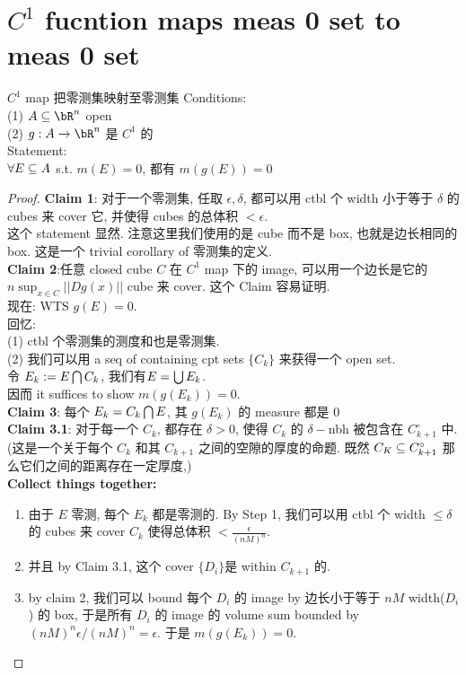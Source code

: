 \section{$C^1$ fucntion maps meas 0 set to meas 0 set}
\begin{theorem}{$C^1$ map 把零测集映射至零测集}
Conditions:\\
(1) $A \sub \bR^n$ open\\
(2) $g: A \rar \bR^n$ 是 $C^1$ 的\\
Statement:\\
$\forall E\subseteq A $ s.t. $m(E)= 0$, 都有 $m(g(E)) = 0$ 
\end{theorem}
\begin{proof}
\textbf{Claim 1}: 对于一个零测集, 任取 $\epsilon, \delta$, 都可以用 ctbl 个 width 小于等于 $\delta$ 的 cubes 来 cover 它, 并使得 cubes 的总体积 $< \epsilon$.\\
这个 statement 显然. 注意这里我们使用的是 cube 而不是 box, 也就是边长相同的 box. 这是一个 trivial corollary of 零测集的定义.\\
\textbf{Claim 2}:任意 closed cube $C$ 在 $C^1$ map 下的 image, 可以用一个边长是它的 $n\sup_{x \in C} ||Dg(x)||$ cube 来 cover. 这个 Claim 容易证明.\\
现在: WTS $g(E) = 0$.\\
回忆:\\
(1) ctbl 个零测集的测度和也是零测集.\\
(2) 我们可以用 a seq of containing cpt sets $\{C_k \}$ 来获得一个 open set.\\
令 $E_k := E \bigcap C_k$, 我们有$E = \bigcup E_k$.\\
因而 it suffices to show $m(g(E_k)) = 0$.\\
\textbf{Claim 3}: 每个 $E_k = C_k \bigcap E$, 其 $g(E_k)$ 的 measure 都是 0\\
\textbf{Claim 3.1}: 对于每一个 $C_k$, 都存在 $\delta > 0$, 使得 $C_k$ 的 $\delta-$nbh 被包含在 $C_{k+1} ^ {\circ}$ 中. (这是一个关于每个 $C_k$ 和其 $C_{k+1}$ 之间的空隙的厚度的命题. 既然 $C_K \subseteq C_{k+1} ^ {\circ}$ 那么它们之间的距离存在一定厚度,)\\
\textbf{Collect things together:}
\begin{enumerate}
    \item 由于 $E$ 零测, 每个 $E_k$ 都是零测的. By Step 1, 我们可以用 ctbl 个 width $\leq \delta$ 的 cubes 来 cover $C_k$ 使得总体积 $< \frac{\epsilon}{(nM)^n}$. 
    \item 并且 by Claim 3.1, 这个 cover $\{D_i\}$是 within $C_{k+1} $ 的. 
    \item by claim 2, 我们可以 bound 每个 $D_i$ 的 image by 边长小于等于 $nM$ width($D_i$) 的 box, 于是所有 $D_i$ 的 image 的 volume sum bounded by $(nM)^n \epsilon /(nM)^n = \epsilon$. 于是 $m(g(E_k)) = 0$.
\end{enumerate}
\end{proof}

